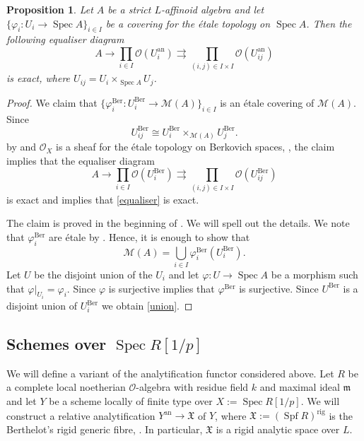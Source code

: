 \documentclass{amsart}
\newtheorem{prop}{Proposition}[section]
\theoremstyle{definition}
\theoremstyle{remark}
\DeclareMathOperator{\Spec}{Spec}
\newcommand{\MM}{\mathscr M}
\newcommand{\mm}{\mathfrak m}
\newcommand{\OO}{\mathcal O}
\newcommand{\ana}{\mathrm{an}}
\DeclareMathOperator{\Spf}{Spf}
\newcommand{\rig}{\mathrm{rig}}
\newcommand{\Ber}{\mathrm{Ber}}
\begin{document}
\begin{prop}
\label{etale_cover_aff} Let $A$ be a strict 
$L$-affinoid algebra and let $\{\varphi_i: U_i\rightarrow \Spec A\}_{i\in I}$ be a covering for the \'etale topology on $\Spec A$. Then the  following equaliser diagram 
\begin{equation}\label{equaliser}
 A \rightarrow \prod_{i\in I} \OO(U^{\ana}_i) \rightrightarrows \prod_{(i,j)\in I \times I} \OO(U^{\ana}_{ij})
\end{equation}
is exact, where $U_{ij}= U_i \times_{\Spec A} U_j$. 
\end{prop}
\begin{proof} We claim that  $\{\varphi^{\Ber}_i: U_i^{\Ber}\rightarrow \MM(A)\}_{i\in I}$ 
is an \'etale covering of $\MM(A)$. Since  
\begin{equation}
U_{ij}^{\Ber}\cong U_i^{\Ber}\times_{\MM(A)} U_j^{\Ber}.
\end{equation}
by \cite[Proposition 2.6.1]{berkovich_ihes}
and $\OO_X$ is a sheaf for the \'etale topology on 
Berkovich spaces, \cite[Example 4.1.6]{berkovich_ihes}, 
the claim implies that the equaliser diagram 
\begin{equation}\label{equaliser2}
 A \rightarrow \prod_{i\in I} \OO(U^{\Ber}_i) \rightrightarrows \prod_{(i,j)\in I \times I} \OO(U^{\Ber}_{ij})
\end{equation}
is exact and 
implies that \eqref{equaliser} is exact. 

The claim is proved in the beginning of \cite[Section 4.1]{berkovich_ihes}. We will spell out the details. We note that $\varphi_i^{\Ber}$ are
\'etale by \cite[Proposition 3.3.11]{berkovich_ihes}.
Hence, it is enough to show that 
\begin{equation}\label{union}
\MM(A)= \bigcup_{i\in I} \varphi_i^{\Ber}(U^{\Ber}_i).
\end{equation}
Let $U$ be the disjoint union of the $U_i$ and let $\varphi: U\rightarrow \Spec A$ be 
a morphism such that $\varphi|_{U_i}= \varphi_i$.  
 Since $\varphi$ is surjective 
\cite[Proposition 2.6.8]{berkovich_ihes} 
implies that $\varphi^{\Ber}$ is surjective. Since
$U^{\Ber}$ is a disjoint union of $U_i^{\Ber}$ we 
obtain \eqref{union}.
\end{proof}

\subsection{\texorpdfstring{Schemes over $\Spec R[1/p]$}{Schemes over Spec R[1/p]}}
We will define a variant of the analytification functor considered above. Let $R$ be a complete local noetherian $\OO$-algebra with residue field $k$ and maximal ideal $\mm$ and let $Y$ be a scheme locally of finite type over $X:=\Spec R[1/p]$.
We will construct  a relative analytification $Y^{\ana}\rightarrow \mathfrak X$ of $Y$, where $\mathfrak X:=(\Spf R)^{\rig}$ is the Berthelot's rigid generic
fibre, \cite[Section 7]{deJong}. In particular, $\mathfrak X$ is a rigid analytic space over $L$.
\end{document}
